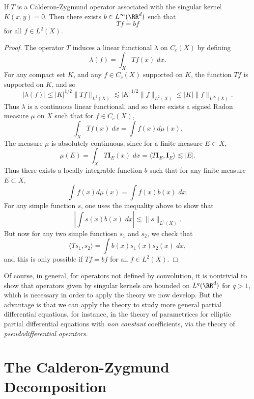 \begin{theorem}
    If $T$ is a Calderon-Zygmund operator associated with the singular kernel $K(x,y) = 0$. Then there exists $b \in L^\infty(\RR^d)$ such that
    \[ Tf = bf \]
    for all $f \in L^2(X)$.
\end{theorem}
\begin{proof}
    The operator $T$ induces a linear functional $\lambda$ on $C_c(X)$ by defining
    \[ \lambda(f) = \int_X Tf(x)\; dx. \]
    For any compact set $K$, and any $f \in C_c(X)$ supported on $K$, the function $Tf$ is supported on $K$, and so
    \[ |\lambda(f)| \leq |K|^{1/2} \| Tf \|_{L^2(X)} \lesssim |K|^{1/2} \| f \|_{L^2(X)} \leq |K| \| f \|_{L^\infty(X)}. \]
    Thus $\lambda$ is a continuous linear functional, and so there exists a signed Radon measure $\mu$ on $X$ such that for $f \in C_c(X)$,
    \[ \int_X Tf(x)\; dx = \int f(x) d\mu(x). \]
    The measure $\mu$ is absolutely continuous, since for a finite measure $E \subset X$,
    \[ \mu(E) = \int_X T \mathbf{I}_E(x)\; dx = \langle T \mathbf{I}_E, \mathbf{I}_E \rangle \lesssim |E|. \]
    Thus there exists a locally integrable function $b$ such that for any finite measure $E \subset X$,
    \[ \int f(x) d\mu(x) = \int f(x) b(x)\; dx. \]
    For any simple function $s$, one uses the inequality above to show that
    \[ \left| \int s(x) b(x)\; dx \right| \lesssim \| s \|_{L^1(X)}. \]
    But now for any two simple functiosn $s_1$ and $s_2$, we check that
    \[ \langle T s_1, s_2 \rangle = \int b(x) s_1(x) s_2(x)\; dx, \]
    and this is only possible if $Tf = bf$ for all $f \in L^2(X)$.
\end{proof}

Of course, in general, for operators not defined by convolution, it is nontrivial to show that operators given by singular kernels are bounded on $L^q(\RR^d)$ for $q > 1$, which is necessary in order to apply the theory we now develop. But the advantage is that we can apply the theory to study more general partial differential equations, for instance, in the theory of parametrices for elliptic partial differential equations with \emph{non constant} coefficients, via the theory of \emph{pseudodifferential operators}.

\section{The Calderon-Zygmund Decomposition}

